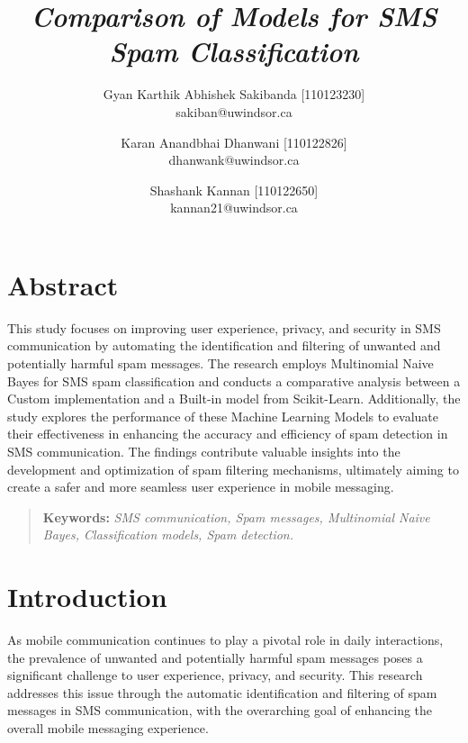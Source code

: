 \documentclass[12pt]{article}
\begin{document}
\title{
  \textbf{
    \textit{
      \LARGE Comparison of Models for SMS Spam Classification
      } 
    } 
  }

\author{
  Gyan Karthik Abhishek Sakibanda [110123230] \\
  sakiban@uwindsor.ca \\
  \and
  Karan Anandbhai Dhanwani [110122826] \\
  dhanwank@uwindsor.ca \\
  \and
  Shashank Kannan [110122650] \\
  kannan21@uwindsor.ca
}

\maketitle

\pagebreak

\section*{Abstract}
This study focuses on improving user experience, privacy, and security in SMS communication by automating the identification and filtering of unwanted and potentially harmful spam messages. The research employs Multinomial Naive Bayes for SMS spam classification and conducts a comparative analysis between a Custom implementation and a Built-in model from Scikit-Learn\cite{scikit-learn}. Additionally, the study explores the performance of these Machine Learning Models to evaluate their effectiveness in enhancing the accuracy and efficiency of spam detection in SMS communication. The findings contribute valuable insights into the development and optimization of spam filtering mechanisms, ultimately aiming to create a safer and more seamless user experience in mobile messaging.

\begin{quote}
\textbf{Keywords:} \textit{SMS communication, Spam messages, Multinomial Naive Bayes, Classification models, Spam detection.}
\end{quote}


\section{Introduction}
As mobile communication continues to play a pivotal role in daily interactions, the prevalence of unwanted and potentially harmful spam messages poses a significant challenge to user experience, privacy, and security\cite{sms-spam}. This research addresses this issue through the automatic identification and filtering of spam messages in SMS communication, with the overarching goal of enhancing the overall mobile messaging experience.\\
\end{document}
